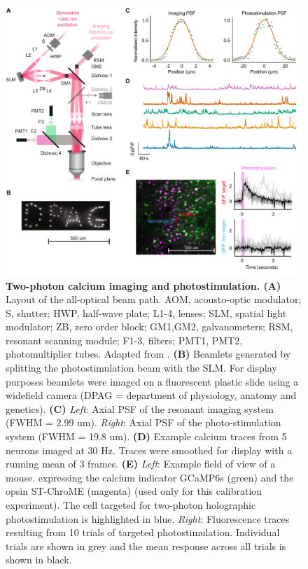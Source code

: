 \begin{figure}[h]
\includegraphics[scale=0.567]{figures/2p_imaging+photostim.pdf}
\caption[\textbf{Two-photon calcium imaging and photostimulation}]{
\textbf{Two-photon calcium imaging and photostimulation. (A)} Layout of the all-optical beam path. AOM, acousto-optic modulator; S, shutter; HWP, half-wave plate; L1-4, lenses; SLM, spatial light modulator; ZB, zero order block; GM1,GM2, galvanometers; RSM, resonant scanning module; F1-3, filters; PMT1, PMT2, photomultiplier tubes. Adapted from \cite{packer_simultaneous_2015}. \textbf{(B)} Beamlets generated by splitting the photostimulation beam with the SLM. For display purposes beamlets were imaged on a fluorescent plastic slide using a widefield camera (DPAG = department of physiology, anatomy and genetics). \textbf{(C)} \textit{Left}: Axial PSF of the resonant imaging system (FWHM = 2.99 um). \textit{Right}: Axial PSF of the photo-stimulation system (FWHM
= 19.8 um). \textbf{(D)} Example calcium traces from 5 neurons imaged at 30 Hz. Traces were smoothed for display with a running mean of 3 frames. \textbf{(E)} \textit{Left}: Example field of view of a mouse. expressing the calcium indicator GCaMP6s (green) and the opsin ST-ChroME (magenta) (used only for this calibration experiment). The cell targeted for two-photon holographic photostimulation is highlighted in blue. \textit{Right}: Fluorescence traces resulting from 10 trials of targeted photostimulation. Individual trials are shown in grey and the mean response across all trials is shown in black. 
} 
\label{fig:all-optical}
\end{figure}

